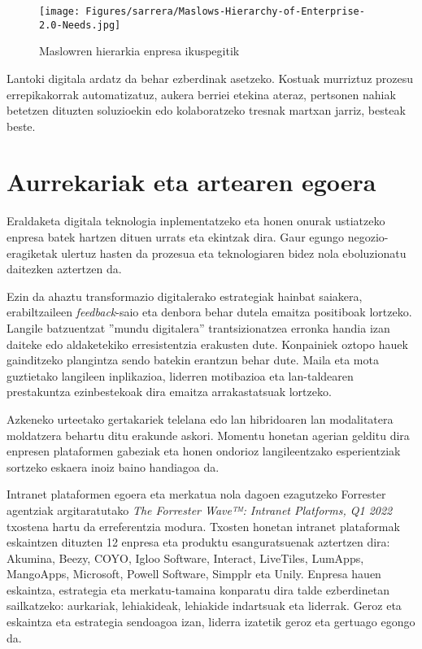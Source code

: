 \begin{figure}[h]
\centering
\texttt{[image: Figures/sarrera/Maslows-Hierarchy-of-Enterprise-2.0-Needs.jpg]}
\caption{Maslowren hierarkia enpresa ikuspegitik}
\label{img:maslow}
\end{figure}

Lantoki digitala ardatz da behar ezberdinak asetzeko. Kostuak murriztuz prozesu errepikakorrak automatizatuz, aukera berriei etekina ateraz, pertsonen nahiak betetzen dituzten soluzioekin edo kolaboratzeko tresnak martxan jarriz, besteak beste.

\section{Aurrekariak eta artearen egoera}

Eraldaketa digitala teknologia inplementatzeko eta honen onurak ustiatzeko enpresa batek hartzen dituen urrats eta ekintzak dira. Gaur egungo negozio-eragiketak
ulertuz hasten da prozesua eta teknologiaren bidez nola eboluzionatu daitezken
aztertzen da. 

Ezin da ahaztu transformazio digitalerako estrategiak hainbat saiakera, erabiltzaileen \textit{feedback}-saio eta denbora behar dutela emaitza positiboak lortzeko. Langile batzuentzat ''mundu digitalera'' trantsizionatzea erronka 
handia izan daiteke edo aldaketekiko erresistentzia erakusten dute. Konpainiek oztopo 
hauek gainditzeko plangintza sendo batekin erantzun behar dute. Maila eta mota 
guztietako langileen inplikazioa, liderren motibazioa eta lan-taldearen prestakuntza 
ezinbestekoak dira emaitza arrakastatsuak lortzeko. 

Azkeneko urteetako gertakariek telelana edo lan hibridoaren lan modalitatera moldatzera behartu ditu erakunde askori. Momentu honetan agerian gelditu dira enpresen plataformen gabeziak eta honen ondorioz langileentzako esperientziak sortzeko eskaera inoiz baino handiagoa da. 

Intranet plataformen egoera eta merkatua nola dagoen ezagutzeko Forrester agentziak argitaratutako \textit{The Forrester Wave™: Intranet Platforms, Q1 2022} txostena \cite{forrester-wave} hartu da erreferentzia modura. Txosten honetan intranet plataformak eskaintzen dituzten 12 enpresa eta produktu esanguratsuenak aztertzen dira: Akumina, Beezy, COYO, Igloo Software, Interact, LiveTiles, LumApps, MangoApps, Microsoft, Powell Software, Simpplr eta Unily. Enpresa hauen eskaintza, estrategia eta merkatu-tamaina konparatu dira talde ezberdinetan sailkatzeko: aurkariak, lehiakideak, lehiakide indartsuak eta liderrak. Geroz eta eskaintza eta estrategia sendoagoa izan, liderra izatetik geroz eta gertuago egongo da. 

